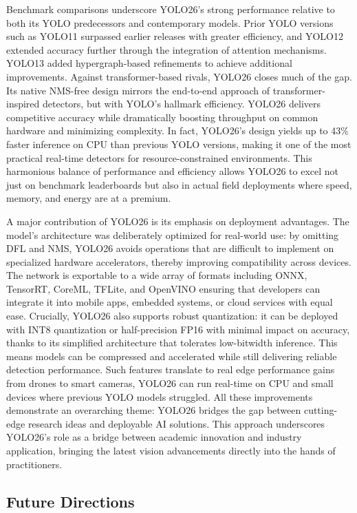 \documentclass{article}
\begin{document}
Benchmark comparisons underscore YOLO26’s strong performance relative to both its YOLO predecessors and contemporary models. Prior YOLO versions such as YOLO11 surpassed earlier releases with greater efficiency, and YOLO12 extended accuracy further through the integration of attention mechanisms. YOLO13 added hypergraph-based refinements to achieve additional improvements. Against transformer-based rivals, YOLO26 closes much of the gap. Its native NMS-free design mirrors the end-to-end approach of transformer-inspired detectors, but with YOLO’s hallmark efficiency. YOLO26 delivers competitive accuracy while dramatically boosting throughput on common hardware and minimizing complexity. In fact, YOLO26’s design yields up to 43\% faster inference on CPU than previous YOLO versions, making it one of the most practical real-time detectors for resource-constrained environments. This harmonious balance of performance and efficiency allows YOLO26 to excel not just on benchmark leaderboards but also in actual field deployments where speed, memory, and energy are at a premium.

A major contribution of YOLO26 is its emphasis on deployment advantages. The model’s architecture was deliberately optimized for real-world use: by omitting DFL and NMS, YOLO26 avoids operations that are difficult to implement on specialized hardware accelerators, thereby improving compatibility across devices. The network is exportable to a wide array of formats including ONNX, TensorRT, CoreML, TFLite, and OpenVINO ensuring that developers can integrate it into mobile apps, embedded systems, or cloud services with equal ease. Crucially, YOLO26 also supports robust quantization: it can be deployed with INT8 quantization or half-precision FP16 with minimal impact on accuracy, thanks to its simplified architecture that tolerates low-bitwidth inference. This means models can be compressed and accelerated while still delivering reliable detection performance. Such features translate to real edge performance gains from drones to smart cameras, YOLO26 can run real-time on CPU and small devices where previous YOLO models struggled. All these improvements demonstrate an overarching theme: YOLO26 bridges the gap between cutting-edge research ideas and deployable AI solutions. This approach underscores YOLO26’s role as a bridge between academic innovation and industry application, bringing the latest vision advancements directly into the hands of practitioners.

\subsection{Future Directions}
\end{document}
